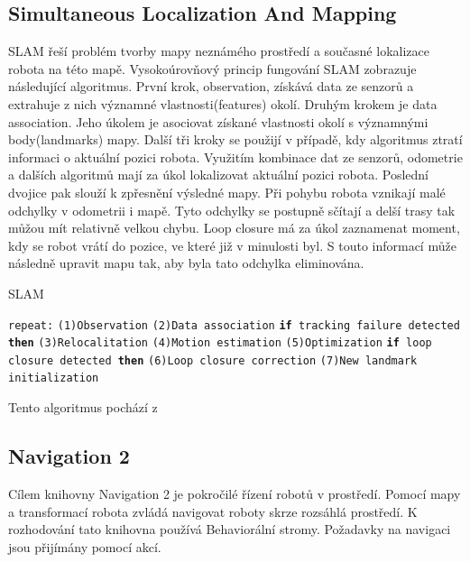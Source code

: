 \subsection*{Simultaneous Localization And Mapping}
SLAM řeší problém tvorby mapy neznámého prostředí a současné lokalizace robota na této mapě. Vysokoúrovňový princip fungování SLAM zobrazuje následující algoritmus. První krok, observation, získává data ze senzorů a extrahuje z nich významné vlastnosti(features) okolí. Druhým krokem je data association. Jeho úkolem je asociovat získané vlastnosti okolí s významnými body(landmarks) mapy. Další tři kroky se použijí v případě, kdy algoritmus ztratí informaci o aktuální pozici robota. Využitím kombinace dat ze senzorů, odometrie a dalších algoritmů mají za úkol lokalizovat aktuální pozici robota. Poslední dvojice pak slouží k zpřesnění výsledné mapy. Při pohybu robota vznikají malé odchylky v odometrii i mapě. Tyto odchylky se postupně sčítají a delší trasy tak můžou mít relativně velkou chybu. Loop closure má za úkol zaznamenat moment, kdy se robot vrátí do pozice, ve které již v minulosti byl. S touto informací může následně upravit mapu tak, aby byla tato odchylka eliminována. \cite{slam}

\begin{algorithm}[h!]
	\label{}
	\caption{\textsc{SLAM}}
	
	\DontPrintSemicolon
	\SetAlgoNoLine
	\SetNlSty{}{}{:}
	\SetNlSkip{-1.1em}
	
	\BlankLine \Indp\Indpp
	
	\texttt{repeat:}\;
	\Indp\Indp
	\texttt{(1)Observation}\;	
	\texttt{(2)Data association}\;
	\texttt{\textbf{if} tracking failure detected \textbf{then}}\;
	\Indp\Indp
	\texttt{(3)Relocalitation}\;
	\texttt{(4)Motion estimation}\;
	\texttt{(5)Optimization}\;
	\Indm\Indm
	\texttt{\textbf{if} loop closure detected \textbf{then}}\;
	\Indp\Indp
	\texttt{(6)Loop closure correction}\;
	\texttt{(7)New landmark initialization}\;
	
\end{algorithm}
\begin{center}
	\vspace{-2em}
	Tento algoritmus pochází z \cite{slam}
\end{center}

\subsection*{Navigation 2}
Cílem knihovny Navigation 2 je pokročilé řízení robotů v prostředí. Pomocí mapy a transformací robota zvládá navigovat roboty skrze rozsáhlá prostředí. K rozhodování tato knihovna používá Behaviorální stromy. Požadavky na navigaci jsou přijímány pomocí akcí. \cite{nav2_documentation}


